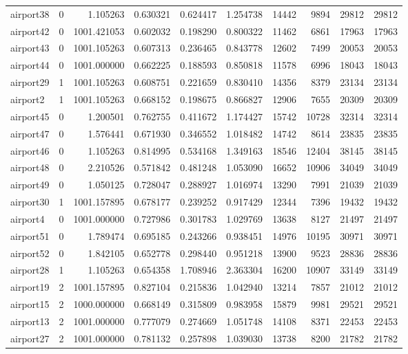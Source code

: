 \begin{longtable}{|l|r|r|r|r|r|r|r|r|r|}
airport38 & 0 & 1.105263 & 0.630321 & 0.624417 & 1.254738 & 14442 & 9894 & 29812 & 29812 \\
airport42 & 0 & 1001.421053 & 0.602032 & 0.198290 & 0.800322 & 11462 & 6861 & 17963 & 17963 \\
airport43 & 0 & 1001.105263 & 0.607313 & 0.236465 & 0.843778 & 12602 & 7499 & 20053 & 20053 \\
airport44 & 0 & 1001.000000 & 0.662225 & 0.188593 & 0.850818 & 11578 & 6996 & 18043 & 18043 \\
airport29 & 1 & 1001.105263 & 0.608751 & 0.221659 & 0.830410 & 14356 & 8379 & 23134 & 23134 \\
airport2 & 1 & 1001.105263 & 0.668152 & 0.198675 & 0.866827 & 12906 & 7655 & 20309 & 20309 \\
airport45 & 0 & 1.200501 & 0.762755 & 0.411672 & 1.174427 & 15742 & 10728 & 32314 & 32314 \\
airport47 & 0 & 1.576441 & 0.671930 & 0.346552 & 1.018482 & 14742 & 8614 & 23835 & 23835 \\
airport46 & 0 & 1.105263 & 0.814995 & 0.534168 & 1.349163 & 18546 & 12404 & 38145 & 38145 \\
airport48 & 0 & 2.210526 & 0.571842 & 0.481248 & 1.053090 & 16652 & 10906 & 34049 & 34049 \\
airport49 & 0 & 1.050125 & 0.728047 & 0.288927 & 1.016974 & 13290 & 7991 & 21039 & 21039 \\
airport30 & 1 & 1001.157895 & 0.678177 & 0.239252 & 0.917429 & 12344 & 7396 & 19432 & 19432 \\
airport4 & 0 & 1001.000000 & 0.727986 & 0.301783 & 1.029769 & 13638 & 8127 & 21497 & 21497 \\
airport51 & 0 & 1.789474 & 0.695185 & 0.243266 & 0.938451 & 14976 & 10195 & 30971 & 30971 \\
airport52 & 0 & 1.842105 & 0.652778 & 0.298440 & 0.951218 & 13900 & 9523 & 28836 & 28836 \\
airport28 & 1 & 1.105263 & 0.654358 & 1.708946 & 2.363304 & 16200 & 10907 & 33149 & 33149 \\
airport19 & 2 & 1001.157895 & 0.827104 & 0.215836 & 1.042940 & 13214 & 7857 & 21012 & 21012 \\
airport15 & 2 & 1000.000000 & 0.668149 & 0.315809 & 0.983958 & 15879 & 9981 & 29521 & 29521 \\
airport13 & 2 & 1001.000000 & 0.777079 & 0.274669 & 1.051748 & 14108 & 8371 & 22453 & 22453 \\
airport27 & 2 & 1001.000000 & 0.781132 & 0.257898 & 1.039030 & 13738 & 8200 & 21782 & 21782 \\

\end{longtable}
